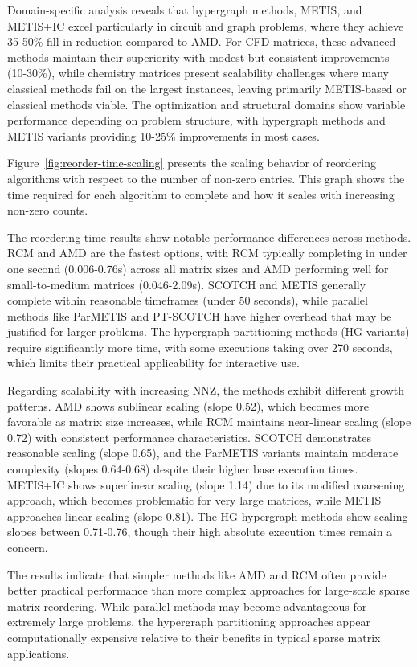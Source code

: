 Domain-specific analysis reveals that hypergraph methods, METIS, and METIS+IC excel particularly in circuit and graph problems, where they achieve 35-50\% fill-in reduction compared to AMD. For CFD matrices, these advanced methods maintain their superiority with modest but consistent improvements (10-30\%), while chemistry matrices present scalability challenges where many classical methods fail on the largest instances, leaving primarily METIS-based or classical methods viable. The optimization and structural domains show variable performance depending on problem structure, with hypergraph methods and METIS variants providing 10-25\% improvements in most cases.

Figure~\ref{fig:reorder-time-scaling} presents the scaling behavior of reordering algorithms with respect to the number of non-zero entries. This graph shows the time required for each algorithm to complete and how it scales with increasing non-zero counts. 

The reordering time results show notable performance differences across methods. RCM and AMD are the fastest options, with RCM typically completing in under one second (0.006-0.76s) across all matrix sizes and AMD performing well for small-to-medium matrices (0.046-2.09s). SCOTCH and METIS generally complete within reasonable timeframes (under 50 seconds), while parallel methods like ParMETIS and PT-SCOTCH have higher overhead that may be justified for larger problems. The hypergraph partitioning methods (HG variants) require significantly more time, with some executions taking over 270 seconds, which limits their practical applicability for interactive use.

Regarding scalability with increasing NNZ, the methods exhibit different growth patterns. AMD shows sublinear scaling (slope 0.52), which becomes more favorable as matrix size increases, while RCM maintains near-linear scaling (slope 0.72) with consistent performance characteristics. SCOTCH demonstrates reasonable scaling (slope 0.65), and the ParMETIS variants maintain moderate complexity (slopes 0.64-0.68) despite their higher base execution times. METIS+IC shows superlinear scaling (slope 1.14) due to its modified coarsening approach, which becomes problematic for very large matrices, while METIS approaches linear scaling (slope 0.81). The HG hypergraph methods show scaling slopes between 0.71-0.76, though their high absolute execution times remain a concern.

The results indicate that simpler methods like AMD and RCM often provide better practical performance than more complex approaches for large-scale sparse matrix reordering. While parallel methods may become advantageous for extremely large problems, the hypergraph partitioning approaches appear computationally expensive relative to their benefits in typical sparse matrix applications.


